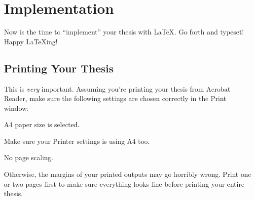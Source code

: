 \chapter{Implementation}\label{chap:implementation}

Now is the time to ``implement'' your thesis with \LaTeX.  Go forth and typeset! Happy \LaTeX{}ing! \Smiley

\section{Printing Your Thesis}
This is \emph{very} important. Assuming you're printing your thesis from Acrobat Reader, make sure the following settings are chosen correctly in the Print window:

\begin{compactitem}
\item A4 paper size is selected.
\item Make sure your Printer settings is using A4 too.
\item No page scaling.
\end{compactitem}

Otherwise, the margins of your printed outputs may go horribly wrong. Print one or two pages first to make sure everything looks fine before printing your entire thesis.
